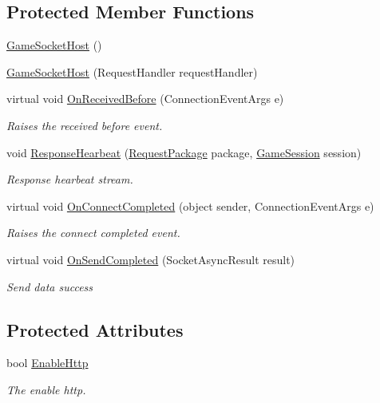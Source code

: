 \subsection*{Protected Member Functions}
\begin{DoxyCompactItemize}
\item 
\mbox{\hyperlink{class_t_net_1_1_contract_1_1_game_socket_host_ad9064eb1e5ebea2df744ef988cbf9ecb}{Game\+Socket\+Host}} ()
\item 
\mbox{\hyperlink{class_t_net_1_1_contract_1_1_game_socket_host_ab026da71c6493153becf4afa1b3e96a2}{Game\+Socket\+Host}} (Request\+Handler request\+Handler)
\item 
virtual void \mbox{\hyperlink{class_t_net_1_1_contract_1_1_game_socket_host_a6e01956e133be70815ebd5f4fb0f8cd1}{On\+Received\+Before}} (Connection\+Event\+Args e)
\begin{DoxyCompactList}\small\item\em Raises the received before event. \end{DoxyCompactList}\item 
void \mbox{\hyperlink{class_t_net_1_1_contract_1_1_game_socket_host_a93d2a165606829575afe771520a99b27}{Response\+Hearbeat}} (\mbox{\hyperlink{class_t_net_1_1_contract_1_1_request_package}{Request\+Package}} package, \mbox{\hyperlink{class_t_net_1_1_contract_1_1_game_session}{Game\+Session}} session)
\begin{DoxyCompactList}\small\item\em Response hearbeat stream. \end{DoxyCompactList}\item 
virtual void \mbox{\hyperlink{class_t_net_1_1_contract_1_1_game_socket_host_af8460eb55e4e5bfbbcbc8ce20292fa25}{On\+Connect\+Completed}} (object sender, Connection\+Event\+Args e)
\begin{DoxyCompactList}\small\item\em Raises the connect completed event. \end{DoxyCompactList}\item 
virtual void \mbox{\hyperlink{class_t_net_1_1_contract_1_1_game_socket_host_a853b966ab69822360739da659d78906f}{On\+Send\+Completed}} (Socket\+Async\+Result result)
\begin{DoxyCompactList}\small\item\em Send data success \end{DoxyCompactList}\end{DoxyCompactItemize}
\subsection*{Protected Attributes}
\begin{DoxyCompactItemize}
\item 
bool \mbox{\hyperlink{class_t_net_1_1_contract_1_1_game_socket_host_ab530052dded4f0701f3699c047b10e0e}{Enable\+Http}}
\begin{DoxyCompactList}\small\item\em The enable http. \end{DoxyCompactList}\end{DoxyCompactItemize}
